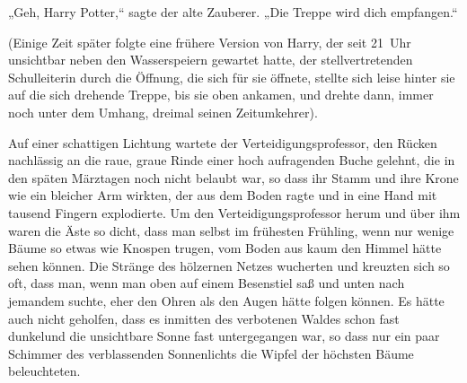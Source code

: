 „Geh, Harry Potter,“ sagte der alte Zauberer. „Die Treppe wird dich empfangen.“

(Einige Zeit später folgte eine frühere Version von Harry, der seit 21~Uhr unsichtbar neben den Wasserspeiern gewartet hatte, der stellvertretenden Schulleiterin durch die Öffnung, die sich für sie öffnete, stellte sich leise hinter sie auf die sich drehende Treppe, bis sie oben ankamen, und drehte dann, immer noch unter dem Umhang, dreimal seinen Zeitumkehrer).


Auf einer schattigen Lichtung wartete der Verteidigungsprofessor, den Rücken nachlässig an die raue, graue Rinde einer hoch aufragenden Buche gelehnt, die in den späten Märztagen noch nicht belaubt war, so dass ihr Stamm und ihre Krone wie ein bleicher Arm wirkten, der aus dem Boden ragte und in eine Hand mit tausend Fingern explodierte. Um den Verteidigungsprofessor herum und über ihm waren die Äste so dicht, dass man selbst im frühesten Frühling, wenn nur wenige Bäume so etwas wie Knospen trugen, vom Boden aus kaum den Himmel hätte sehen können. Die Stränge des hölzernen Netzes wucherten und kreuzten sich so oft, dass man, wenn man oben auf einem Besenstiel saß und unten nach jemandem suchte, eher den Ohren als den Augen hätte folgen können. Es hätte auch nicht geholfen, dass es inmitten des verbotenen Waldes schon fast dunkelund die unsichtbare Sonne fast untergegangen war, so dass nur ein paar Schimmer des verblassenden Sonnenlichts die Wipfel der höchsten Bäume beleuchteten.

